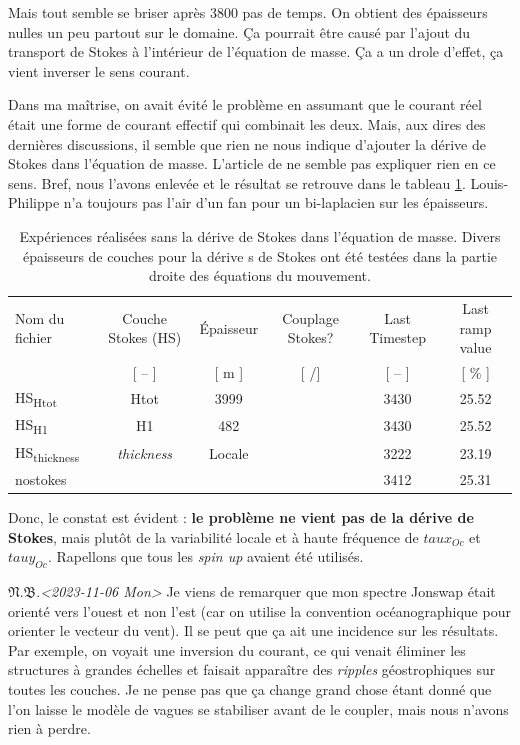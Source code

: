 \documentclass[10pt]{report}
\numberwithin{equation}{section}
\newcommand{\pt}{\hspace{1pt}} %
\newcommand{\nb}{\underline{{\footnotesize\EightStarConvex}\pt $\mathfrak{N.B.}$\vphantom{p}}\hspace{3pt}}
\newcommand{\cmark}{\ding{52}}
\newcommand{\xmark}{\ding{55}}
\begin{document}
Mais tout semble se briser après 3800 pas de temps.
On obtient des épaisseurs nulles un peu partout sur le domaine.
Ça pourrait être causé par l'ajout du transport de Stokes à l'intérieur de l'équation de masse.
Ça a un drole d'effet, ça vient inverser le sens courant. \bigskip

Dans ma maîtrise, on avait évité le problème en assumant que le courant réel était une forme de courant effectif qui combinait les deux.
Mais, aux dires des dernières discussions, il semble que rien ne nous indique d'ajouter la dérive de Stokes dans l'équation de masse.
L'article de \Textcite{suzuki2016understanding} ne semble pas expliquer rien en ce sens.
Bref, nous l'avons enlevée et le résultat se retrouve dans le tableau \ref{tab:orgb1cc303}.
Louis-Philippe n'a toujours pas l'air d'un fan pour un bi-laplacien sur les épaisseurs.

\begin{table}[htbp]
\caption{\label{tab:orgb1cc303}Expériences réalisées sans la dérive de Stokes dans l'équation de masse. Divers épaisseurs de couches pour la dérive s de Stokes ont été testées dans la partie droite des équations du mouvement.}
\centering
\begin{tabular}{lccccc}
\hline
\hline
Nom du fichier & Couche Stokes (HS) & Épaisseur & Couplage Stokes? & Last Timestep & Last ramp value\\[0pt]
[ -- ] & [ -- ] & [ m ] & [ \cmark/\xmark ] & [ -- ] & [ \% ]\\[0pt]
\hline
HS\textsubscript{Htot} & Htot & 3999 & \cmark & 3430 & 25.52\\[0pt]
HS\textsubscript{H1} & H1 & 482 & \cmark & 3430 & 25.52\\[0pt]
HS\textsubscript{thickness} & \emph{thickness} & Locale & \cmark & 3222 & 23.19\\[0pt]
nostokes & \xmark & \xmark & \xmark & 3412 & 25.31\\[0pt]
\hline
\end{tabular}
\end{table}

Donc, le constat est évident : \textbf{le problème ne vient pas de la dérive de Stokes}, mais plutôt de la variabilité locale et à haute fréquence de \(taux_{Oc}\) et \(tauy_{Oc}\).
Rapellons que tous les \emph{spin up} avaient été utilisés. \bigskip

\nb \textit{<2023-11-06 Mon> } Je viens de remarquer que mon spectre Jonswap était orienté vers l'ouest et non l'est (car on utilise la convention océanographique pour orienter le vecteur du vent).
Il se peut que ça ait une incidence sur les résultats.
Par exemple, on voyait une inversion du courant, ce qui venait éliminer les structures à grandes échelles et faisait apparaître des \emph{ripples} géostrophiques sur toutes les couches.
Je ne pense pas que ça change grand chose étant donné que l'on laisse le modèle de vagues se stabiliser avant de le coupler, mais nous n'avons rien à perdre. 
\end{document}
